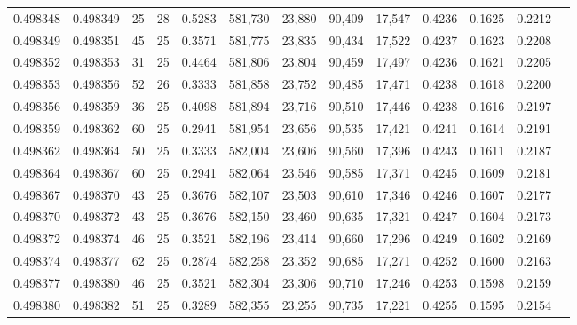 \begin{tabular}{rrrrrrrrrrrrr}
0.498348 & 0.498349 &    25 &  28 &                                     0.5283 & 581,730 &  23,880 &  90,409 &  17,547 & 0.4236 & 0.1625 & 0.2212 \\
0.498349 & 0.498351 &    45 &  25 &                                     0.3571 & 581,775 &  23,835 &  90,434 &  17,522 & 0.4237 & 0.1623 & 0.2208 \\
0.498352 & 0.498353 &    31 &  25 &                                     0.4464 & 581,806 &  23,804 &  90,459 &  17,497 & 0.4236 & 0.1621 & 0.2205 \\
0.498353 & 0.498356 &    52 &  26 &                                     0.3333 & 581,858 &  23,752 &  90,485 &  17,471 & 0.4238 & 0.1618 & 0.2200 \\
0.498356 & 0.498359 &    36 &  25 &                                     0.4098 & 581,894 &  23,716 &  90,510 &  17,446 & 0.4238 & 0.1616 & 0.2197 \\
0.498359 & 0.498362 &    60 &  25 &                                     0.2941 & 581,954 &  23,656 &  90,535 &  17,421 & 0.4241 & 0.1614 & 0.2191 \\
0.498362 & 0.498364 &    50 &  25 &                                     0.3333 & 582,004 &  23,606 &  90,560 &  17,396 & 0.4243 & 0.1611 & 0.2187 \\
0.498364 & 0.498367 &    60 &  25 &                                     0.2941 & 582,064 &  23,546 &  90,585 &  17,371 & 0.4245 & 0.1609 & 0.2181 \\
0.498367 & 0.498370 &    43 &  25 &                                     0.3676 & 582,107 &  23,503 &  90,610 &  17,346 & 0.4246 & 0.1607 & 0.2177 \\
0.498370 & 0.498372 &    43 &  25 &                                     0.3676 & 582,150 &  23,460 &  90,635 &  17,321 & 0.4247 & 0.1604 & 0.2173 \\
0.498372 & 0.498374 &    46 &  25 &                                     0.3521 & 582,196 &  23,414 &  90,660 &  17,296 & 0.4249 & 0.1602 & 0.2169 \\
0.498374 & 0.498377 &    62 &  25 &                                     0.2874 & 582,258 &  23,352 &  90,685 &  17,271 & 0.4252 & 0.1600 & 0.2163 \\
0.498377 & 0.498380 &    46 &  25 &                                     0.3521 & 582,304 &  23,306 &  90,710 &  17,246 & 0.4253 & 0.1598 & 0.2159 \\
0.498380 & 0.498382 &    51 &  25 &                                     0.3289 & 582,355 &  23,255 &  90,735 &  17,221 & 0.4255 & 0.1595 & 0.2154 \\

\end{tabular}
